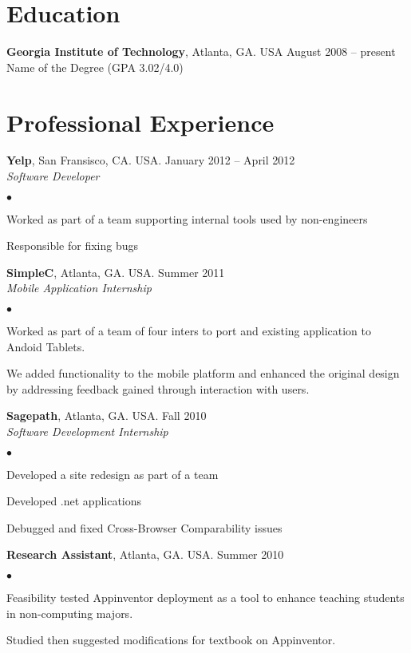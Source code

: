 \documentclass[margin,line]{res}
\newenvironment{list2}{
  \begin{list}{$\bullet$}{%
      \setlength{\itemsep}{0in}
      \setlength{\parsep}{0in} \setlength{\parskip}{0in}
      \setlength{\topsep}{0in} \setlength{\partopsep}{0in}
      \setlength{\leftmargin}{0.2in}}}{\end{list}}
\begin{document}
\begin{resume}
\section{\sc Education}
{\bf Georgia Institute of Technology}, Atlanta, GA. USA \hfill August 2008 -- present\\

Name of the Degree \hfill(GPA 3.02/4.0)
 
\section{\sc Professional Experience}
{\bf Yelp}, San Fransisco, CA. USA. \hfill{January 2012 -- April 2012}\\
{\em Software Developer}\hfill\\
    \begin{list2} %
    \item Worked as part of a team supporting internal tools used by
      non-engineers \\
    \item Responsible for fixing bugs \\
\end{list2}
{\bf SimpleC}, Atlanta, GA. USA. \hfill{Summer 2011}\\
{\em Mobile Application Internship} \\
\begin{list2} %
    \item Worked as part of a team of four inters to port and existing
      application to Andoid Tablets. \\
    \item We added functionality to the mobile platform and enhanced the
      original design by addressing feedback gained through interaction
      with users.\\
\end{list2}
{\bf Sagepath}, Atlanta, GA. USA. \hfill{Fall 2010}\\
{\em Software Development Internship} \\
\begin{list2} %
    \item Developed a site redesign as part of a team \\
    \item Developed .net applications \\
    \item Debugged and fixed Cross-Browser Comparability issues \\
\end{list2}
{\bf Research Assistant}, Atlanta, GA. USA. \hfill{Summer 2010}\\
\begin{list2} %
    \item Feasibility tested Appinventor deployment as a tool to
      enhance teaching students in non-computing majors.
    \item Studied then suggested modifications for textbook on Appinventor.\\
\end{list2}

\end{resume}
\end{document}
